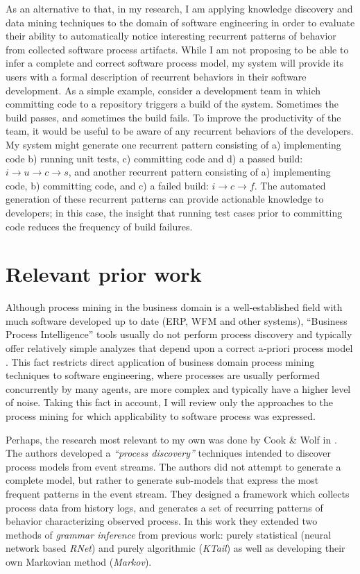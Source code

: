 \documentclass{sig-alternate}
\begin{document}
As an alternative to that, in my research, I am applying knowledge discovery and data mining techniques to the domain of software engineering in order to evaluate their ability to automatically notice interesting recurrent patterns of behavior from collected software process artifacts. While I am not proposing to be able to infer a complete and correct software process model, my system will provide its users with a formal description of recurrent behaviors in their software development. As a simple example, consider a development team in which committing code to a repository triggers a build of the system. Sometimes the build passes, and sometimes the build fails. To improve the productivity of the team, it would be useful to be aware of any recurrent behaviors of the developers. My system might generate one recurrent pattern consisting of a) implementing code b) running unit tests, c) committing code and d) a passed build: $i \rightarrow u \rightarrow c \rightarrow s $, and another recurrent pattern consisting of a) implementing code, b) committing code, and c) a failed build: $i \rightarrow c \rightarrow f $. The automated generation of these recurrent patterns can provide actionable knowledge to developers; in this case, the insight that running test cases prior to committing code reduces the frequency of build failures.

\section{Relevant prior work}
Although process mining in the business domain is a well-established field with much software developed up to date (ERP, WFM and other systems), ``Business Process Intelligence'' tools usually do not perform process discovery and typically offer relatively simple analyzes that depend upon a correct a-priori process model \cite{citeulike:3718014} \cite{citeulike:5044991}. This fact restricts direct application of business domain process mining techniques to software engineering, where processes are usually performed concurrently by many agents, are more complex and typically have a higher level of noise. Taking this fact in account, I will review only the approaches to the process mining for which applicability to software process was expressed. 

Perhaps, the research most relevant to my own was done by Cook \& Wolf in \cite{citeulike:328044}. The authors developed a \textit{``process discovery''} techniques intended to discover process models from event streams. The authors did not attempt to generate a complete model, but rather to generate sub-models that express the most frequent patterns in the event stream. They designed a framework which collects process data from history logs, and generates a set of recurring patterns of behavior characterizing observed process. In this work they extended two methods of \textit{grammar inference} from previous work: purely statistical (neural network based \textit{RNet}) and purely algorithmic (\textit{KTail}) as well as developing their own Markovian method (\textit{Markov}). 
\end{document}
